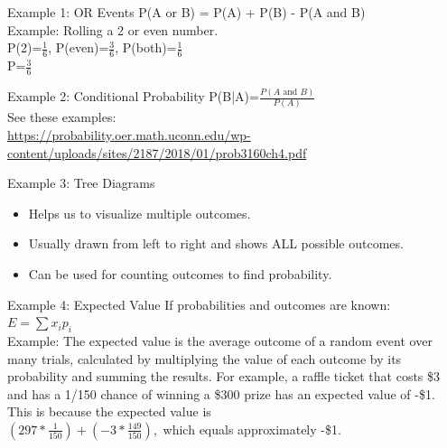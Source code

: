 \documentclass{beamer}
\begin{document}
\begin{frame}{Example 1: OR Events}
P(A or B) = P(A) + P(B) - P(A and B)
\\
\vspace{0.2 cm}
Example: Rolling a 2 or even number.
\\
\vspace{0.2 cm}
P(2)=\(\frac{1}{6}\), P(even)=\(\frac{3}{6}\), P(both)=\(\frac{1}{6}\)
\\
\vspace{0.2 cm}
P=\(\frac{3}{6}\)
\end{frame}

\begin{frame}{Example 2: Conditional Probability}
P(B|A)=\(\frac{P(A\text{ and }B)}{P(A)}\)
\\
\vspace{0.2 cm}
See these examples:\\
\vspace{0.2 cm}
\url{https://probability.oer.math.uconn.edu/wp-content/uploads/sites/2187/2018/01/prob3160ch4.pdf}
\end{frame}

\begin{frame}{Example 3: Tree Diagrams}

\begin{itemize}
    \item Helps us to visualize multiple outcomes.
    \item Usually drawn from left to right and shows ALL possible outcomes.
    \item Can be used for counting outcomes to find probability.
\end{itemize}

\end{frame}

\begin{frame}{Example 4: Expected Value}
If probabilities and outcomes are known:
\vspace{0.2 cm}
\\
\(E = \sum x_i p_i\)
\\
\vspace{0.2 cm}
Example: The expected value is the average outcome of a random event over many trials, calculated by multiplying the value of each outcome by its probability and summing the results. For example, a raffle ticket that costs \$3 and has a 1/150 chance of winning a \$300 prize has an expected value of -\$1. \\
This is because the expected value is \\
\vspace{1.0 cm}
$\left(297 * \frac{1}{150}\right) + \left(-3 * \frac{149}{150}\right),$ which equals approximately -\$1. 
\end{frame}
\end{document}
